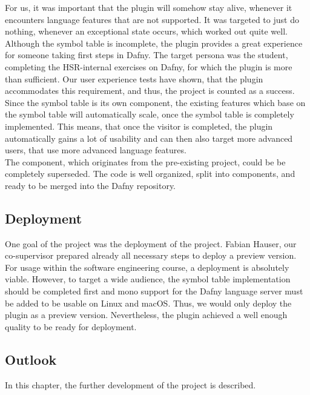 For us, it was important that the plugin will somehow stay alive, whenever it encounters language features that are not supported.
It was targeted to just do nothing, whenever an exceptional state occurs, which worked out quite well.\\

Although the symbol table is incomplete, the plugin provides a great experience for someone taking first steps in Dafny.
The target persona was the student, completing the HSR-internal exercises on Dafny, for which the plugin is more than sufficient.
Our user experience tests have shown, that the plugin accommodates this requirement, and thus, the project is counted as a success.\\

Since the symbol table is its own component, the existing features which base on the symbol table will automatically scale, once the symbol table is completely implemented.
This means, that once the visitor is completed, the plugin automatically gains a lot of usability and can then also target more advanced users, that use more advanced language features.\\

The  component, which originates from the pre-existing project, could be be completely superseded.
The code is well organized, split into components, and ready to be merged into the Dafny repository. 

\subsection{Deployment} 
One goal of the project was the deployment of the project.
Fabian Hauser, our co-supervisor prepared already all necessary steps to deploy a preview version.
For usage within the software engineering course, a deployment is absolutely viable.
However, to target a wide audience, the symbol table implementation should be completed first
and mono support for the Dafny language server must be added to be usable on Linux and macOS.
Thus, we would only deploy the plugin as a preview version.
Nevertheless, the plugin achieved a well enough quality to be ready for deployment.

\subsection{Outlook}
In this chapter, the further development of the project is described.

